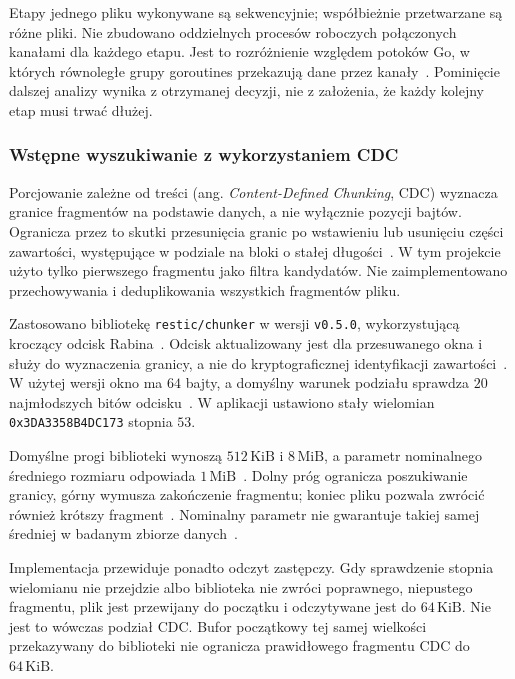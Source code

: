Etapy jednego pliku wykonywane są sekwencyjnie; współbieżnie
przetwarzane są różne pliki.
Nie zbudowano oddzielnych procesów roboczych połączonych kanałami
dla każdego etapu. Jest to rozróżnienie względem potoków Go,
w których równoległe grupy goroutines przekazują dane przez
kanały~\cite{go_pipelines}.
Pominięcie dalszej analizy wynika z otrzymanej decyzji,
nie z założenia, że każdy kolejny etap musi trwać dłużej.

\subsubsection{Wstępne wyszukiwanie z wykorzystaniem CDC}
\label{subsubsec:potok-cdc}

Porcjowanie zależne od treści (ang. \textit{Content-Defined Chunking},
CDC) wyznacza granice fragmentów na podstawie danych, a nie wyłącznie
pozycji bajtów. Ogranicza przez to skutki przesunięcia granic po
wstawieniu lub usunięciu części zawartości, występujące w podziale
na bloki o stałej długości~\cite{gregoriadis2024cdc}.
W tym projekcie użyto tylko pierwszego fragmentu jako filtra
kandydatów. Nie zaimplementowano przechowywania i deduplikowania
wszystkich fragmentów pliku.

Zastosowano bibliotekę \texttt{restic/chunker} w wersji
\texttt{v0.5.0}, wykorzystującą kroczący odcisk
Rabina~\cite{restic2026chunker}.
Odcisk aktualizowany jest dla przesuwanego okna i służy do wyznaczenia
granicy, a nie do kryptograficznej identyfikacji
zawartości~\cite{gregoriadis2024cdc}.
W użytej wersji okno ma \(64\) bajty, a domyślny warunek podziału
sprawdza \(20\) najmłodszych bitów odcisku~\cite{restic2026code}.
W aplikacji ustawiono stały wielomian
\texttt{0x3DA3358B4DC173} stopnia \(53\).

Domyślne progi biblioteki wynoszą \(512\,\mathrm{KiB}\)
i \(8\,\mathrm{MiB}\), a parametr nominalnego średniego rozmiaru
odpowiada \(1\,\mathrm{MiB}\)~\cite{restic2026chunker,restic2026code}.
Dolny próg ogranicza poszukiwanie granicy, górny wymusza zakończenie
fragmentu; koniec pliku pozwala zwrócić również krótszy
fragment~\cite{restic2026code}.
Nominalny parametr nie gwarantuje takiej samej średniej w badanym
zbiorze danych~\cite{gregoriadis2024cdc}.

Implementacja przewiduje ponadto odczyt zastępczy.
Gdy sprawdzenie stopnia wielomianu nie przejdzie albo biblioteka
nie zwróci poprawnego, niepustego fragmentu, plik jest przewijany
do początku i odczytywane jest do \(64\,\mathrm{KiB}\).
Nie jest to wówczas podział CDC.
Bufor początkowy tej samej wielkości przekazywany do biblioteki
nie ogranicza prawidłowego fragmentu CDC do \(64\,\mathrm{KiB}\).

